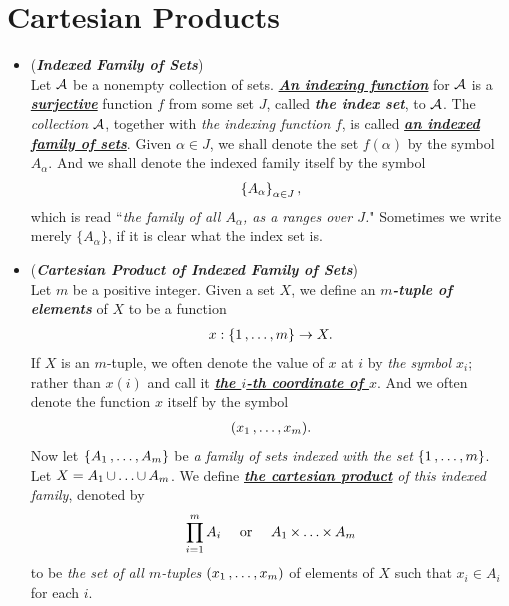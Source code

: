 \documentclass[11pt]{article}
\begin{document}
\section{Cartesian Products}
\begin{itemize}
\item \begin{definition} (\emph{\textbf{Indexed Family of Sets}})\\
Let ${\mathcal A}$ be a nonempty collection of sets. \underline{\emph{\textbf{An indexing function}}} for ${\mathcal A}$ is a \underline{\emph{\textbf{surjective}}} function $f$ from some set $J$, called \emph{\textbf{the index set}}, to ${\mathcal A}$. The \emph{collection} ${\mathcal A}$, together with \emph{the indexing function} $f$, is called \underline{\emph{\textbf{an indexed family of sets}}}. Given $\alpha \in J$, we shall denote the set $f(\alpha)$ by the symbol $A_{\alpha}$. And we shall denote the indexed family itself by the symbol
\begin{align*}
\left\{A_{\alpha}\right\}_{\alpha \in J},
\end{align*}
which is read ``\emph{the family of all $A_{\alpha}$, as a ranges over $J$.}" Sometimes we write merely $\{A_{\alpha}\}$, if it is clear what the index set is.
\end{definition}

\item \begin{definition} (\emph{\textbf{Cartesian Product of Indexed Family of Sets}})\\
Let $m$ be a positive integer. Given a set $X$, we define an \emph{\textbf{$m$-tuple of elements}} of $X$ to be a function
\begin{align*}
x: \left\{1 \,{,}\ldots{,}\, m\right\} \rightarrow X.
\end{align*}
If $X$ is an $m$-tuple, we often denote the value of $x$ at $i$ by \emph{the symbol $x_i$}; rather than $x(i)$ and call it \underline{\emph{\textbf{the $i$-th coordinate of $x$}}}. And we often denote the function $x$ itself by the symbol
\begin{align*}
(x_1 \,{,}\ldots{,}\, x_m).
\end{align*}
Now let $\{A_1 \,{,}\ldots{,}\, A_m\}$ be \emph{a family of sets indexed with the set} $\{1 \,{,}\ldots{,}\, m\}$. Let $X = A_1 \,{\cup}\ldots{\cup}\, A_m$. We define \emph{\textbf{\underline{the cartesian product}} of this indexed family}, denoted by
\begin{align*}
\prod_{i=1}^{m}A_i \quad \text{ or } \quad A_1 \,{\times}\ldots{\times}\, A_m
\end{align*}
to be \emph{the set of all $m$-tuples} $(x_1 \,{,}\ldots{,}\, x_m)$ of elements of $X$ such that $x_i \in A_i$ for each $i$.
\end{definition}


\end{itemize}
\end{document}
